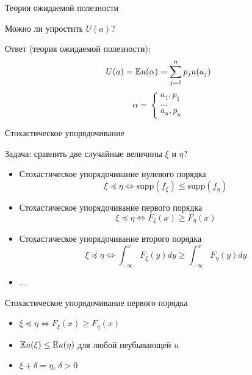 \documentclass{beamer}
\begin{document}
\begin{frame}{Теория ожидаемой полезности}

Можно ли упростить $U(a)$?

\pause

Ответ (теория ожидаемой полезности): 
$$
U(a) = \mathbb{E} u(\alpha) = \sum_{j=1}^n p_j u(a_j) 
$$
\begin{equation*}\textbf{}
    \alpha = \begin{cases}
        a_1, p_1\\
        \ldots\\
        a_n, p_n
    \end{cases}    
\end{equation*}


   
\end{frame}


\begin{frame}{Стохастическое упорядочивание}

Задача: сравнить две случайные величины $\xi$ и $\eta$?

\pause

\begin{itemize}
    \item Стохастическое упорядочивание нулевого порядка
$$
\xi \preceq \eta \Leftrightarrow \text{supp}(f_\xi) \leq \text{supp}(f_\eta)
$$

\item Стохастическое упорядочивание первого порядка
$$
\xi \preceq \eta \Leftrightarrow F_\xi(x) \geq F_\eta(x)
$$

\item Стохастическое упорядочивание второго порядка
$$
\xi \preceq \eta \Leftrightarrow \int_{-\infty}^x F_\xi(y)dy \geq \int_{-\infty}^x F_\eta(y)dy
$$

\item ...
\end{itemize}
\end{frame}


\begin{frame}{Стохастическое упорядочивание первого порядка}
\begin{itemize}
\item $
\xi \preceq \eta \Leftrightarrow F_\xi(x) \geq F_\eta(x)
$
\item $\mathbb{E} u(\xi) \leq \mathbb{E} u(\eta)$ для любой неубывающей $u$

\item $\xi + \delta = \eta$, $\delta > 0$

\end{itemize}

\end{frame}
\end{document}
